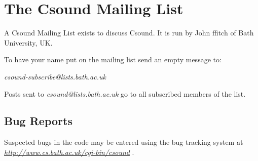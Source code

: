 \begin{comment}
\documentclass[10pt]{article}
\usepackage{fullpage, graphicx, url}
\setlength{\parskip}{1ex}
\setlength{\parindent}{0ex}
\title{The Csound Mailing List}



\begin{tabular}{ccc}
The Alternative Csound Reference Manual & & \\
Previous &Introduction &Next

\end{tabular}

\end{comment}
\section{The Csound Mailing List}


  A Csound Mailing List exists to discuss Csound. It is run by John ffitch of Bath University, UK. 


  To have your name put on the mailing list send an empty message to: 


  \emph{csound-subscribe@lists.bath.ac.uk}
 


  Posts sent to  \emph{csound@lists.bath.ac.uk}
  go to all subscribed members of the list. 
\subsection*{Bug Reports}


  Suspected bugs in the code may be entered using the bug tracking system at \emph{\url{http://www.cs.bath.ac.uk/cgi-bin/csound}}
. 


\begin{comment}
\begin{tabular}{lcr}
Previous &Home &Next \\
How to Install Csound &Up &The Csound Command

\end{tabular}



\end{comment}
